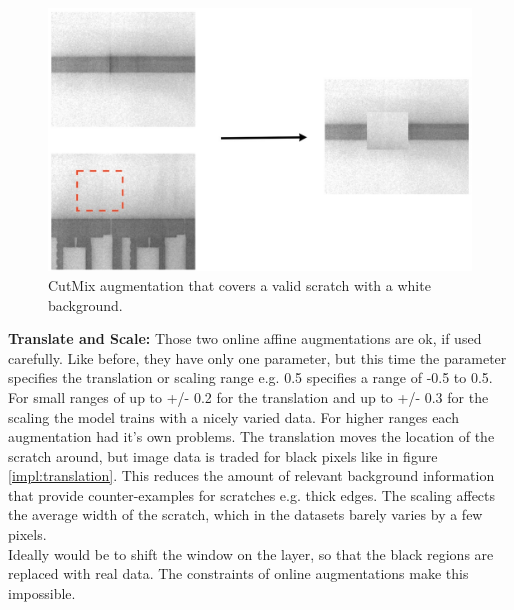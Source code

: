 \begin{figure}[!h]
  \centering
  \captionsetup{justification=centering,margin=2cm}
  \includegraphics[width=0.75\columnwidth]{images/implementation/augmentations/cut_mix_example}
  \caption{CutMix augmentation that covers a valid scratch with a white background.}
  \label{impl:cut_mix}
\end{figure}


\textbf{Translate and Scale: }
Those two online affine augmentations are ok, if used carefully. Like before, they have only one parameter, but this time the parameter specifies the translation or scaling range e.g. 0.5 specifies a range of -0.5 to 0.5. For small ranges of up to +/- 0.2 for the translation and up to +/- 0.3 for the scaling the model trains with a nicely varied data. For higher ranges each augmentation had it's own problems. The translation moves the location of the scratch around, but image data is traded for black pixels like in figure \ref{impl:translation}. This reduces the amount of relevant background information that provide counter-examples for scratches e.g. thick edges. The scaling affects the average width of the scratch, which in the datasets barely varies by a few pixels. \\
Ideally would be to shift the window on the layer, so that the black regions are replaced with real data. The constraints of online augmentations make this impossible. \\

